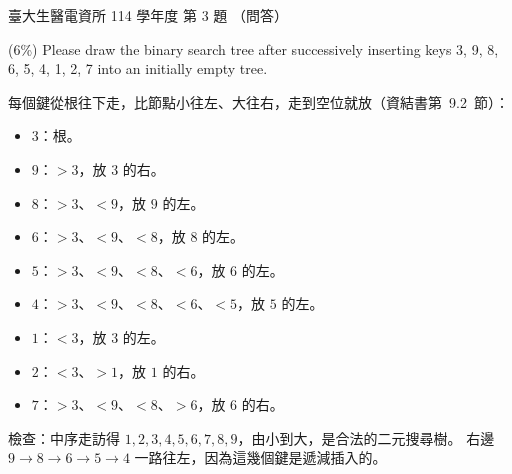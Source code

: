 \begin{pastexam}[label={px:ntu-114-bmei-ca-03}]{臺大生醫電資所 114 學年度 第 3 題}
（問答）

(6\%) Please draw the binary search tree after successively inserting keys 3, 9, 8, 6, 5, 4, 1, 2, 7 into an initially empty tree.
\end{pastexam}

\begin{pastsoln}
每個鍵從根往下走，比節點小往左、大往右，走到空位就放（資結書第~9.2~節）：
\begin{itemize}
\item $3$：根。
\item $9$：$> 3$，放 $3$ 的右。
\item $8$：$> 3$、$< 9$，放 $9$ 的左。
\item $6$：$> 3$、$< 9$、$< 8$，放 $8$ 的左。
\item $5$：$> 3$、$< 9$、$< 8$、$< 6$，放 $6$ 的左。
\item $4$：$> 3$、$< 9$、$< 8$、$< 6$、$< 5$，放 $5$ 的左。
\item $1$：$< 3$，放 $3$ 的左。
\item $2$：$< 3$、$> 1$，放 $1$ 的右。
\item $7$：$> 3$、$< 9$、$< 8$、$> 6$，放 $6$ 的右。
\end{itemize}
\begin{center}
\end{center}
檢查：中序走訪得 $1, 2, 3, 4, 5, 6, 7, 8, 9$，由小到大，是合法的二元搜尋樹。 右邊 $9 \to 8 \to 6 \to 5 \to 4$
一路往左，因為這幾個鍵是遞減插入的。
\end{pastsoln}
